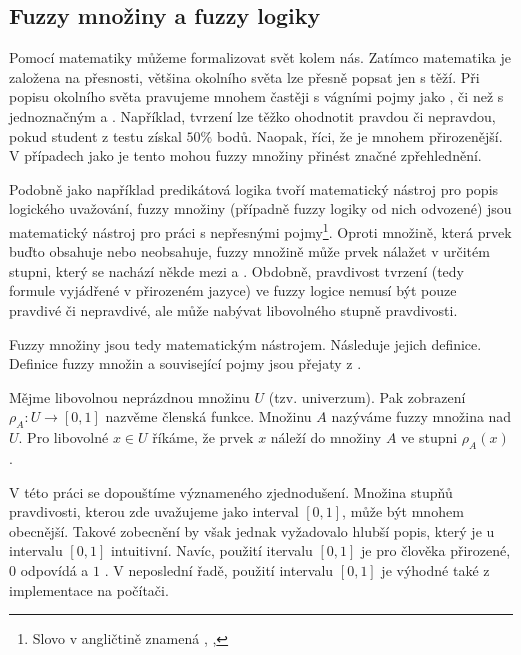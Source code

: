 \documentclass[a4paper,10pt]{article}
\begin{document}
\subsection{Fuzzy množiny a fuzzy logiky}
Pomocí matematiky můžeme formalizovat svět kolem nás. Zatímco matematika je založena na přesnosti, většina okolního světa lze přesně popsat jen s těží. Při popisu okolního světa pravujeme mnohem častěji s vágními pojmy jako ,  či  než s jednoznačným  a . Například, tvrzení  lze těžko ohodnotit pravdou či nepravdou, pokud student z testu získal $50\%$ bodů. Naopak, říci, že  je mnohem přirozenější. V případech jako je tento mohou fuzzy množiny přinést značné zpřehlednění.

Podobně jako například predikátová logika tvoří matematický nástroj pro popis logického uvažování, fuzzy množiny (případně fuzzy logiky od nich odvozené) jsou matematický nástroj pro práci s nepřesnými pojmy\footnote{Slovo  v angličtině znamená , , }. Oproti  množině, která prvek buďto obsahuje nebo neobsahuje, fuzzy množině může prvek nálažet v určitém stupni, který se nachází někde mezi  a . Obdobně, pravdivost tvrzení (tedy formule vyjádřené v přirozeném jazyce) ve fuzzy logice nemusí být pouze pravdivé či nepravdivé, ale může nabývat libovolného stupně pravdivosti.

Fuzzy množiny jsou tedy matematickým nástrojem. Následuje jejich definice. Definice fuzzy množin a související pojmy jsou přejaty z \cite{Bel-FuzRelSys}.

\begin{definition}
 Mějme libovolnou neprázdnou množinu $U$ (tzv. univerzum). Pak zobrazení $\rho_A: U \rightarrow [0, 1]$ nazvěme členská funkce. Množinu $A$ nazýváme fuzzy množina nad $U$. Pro libovolné $x \in U$ říkáme, že prvek $x$ náleží do množiny $A$ ve stupni $\rho_A(x)$.
\end{definition}

V této práci se dopouštíme význameného zjednodušení. Množina stupňů pravdivosti, kterou zde uvažujeme jako interval $[0, 1]$, může být mnohem obecnější. Takové zobecnění by však jednak vyžadovalo hlubší popis, který je u intervalu $[0, 1]$ intuitivní. Navíc, použití itervalu $[0, 1]$ je pro člověka přirozené, $0$ odpovídá  a $1$ . V neposlední řadě, použití intervalu $[0, 1]$ je výhodné také z implementace na počítači.
\end{document}

